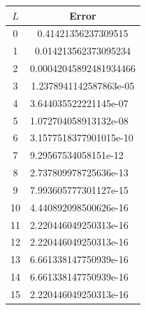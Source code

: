 \documentclass[12pt, a4paper]{article}
\begin{document}
\begin{minipage}{\textwidth}\centering
	\begin{tabular}{|l|l|}
	\hline
	\multicolumn{1}{|c|}{$L$} & \multicolumn{1}{c|}{Error}                  \\ \hline
	\multicolumn{1}{|c|}{0}   & \multicolumn{1}{c|}{0.41421356237309515}    \\ \hline
	\multicolumn{1}{|c|}{1}   & \multicolumn{1}{c|}{0.014213562373095234}   \\ \hline
	\multicolumn{1}{|c|}{2}   & \multicolumn{1}{c|}{0.00042045892481934466} \\ \hline
	\multicolumn{1}{|c|}{3}   & \multicolumn{1}{c|}{1.2378941142587863e-05} \\ \hline
	\multicolumn{1}{|c|}{4}   & 3.644035522221145e-07                       \\ \hline
	\multicolumn{1}{|c|}{5}   & 1.072704058913132e-08                       \\ \hline
	\multicolumn{1}{|c|}{6}   & 3.1577518377901015e-10                      \\ \hline
	\multicolumn{1}{|c|}{7}   & 9.29567534058151e-12                        \\ \hline
	\multicolumn{1}{|c|}{8}   & 2.737809978725636e-13                       \\ \hline
	\multicolumn{1}{|c|}{9}   & 7.993605777301127e-15                       \\ \hline
	10                        & 4.440892098500626e-16                       \\ \hline
	11                        & 2.220446049250313e-16                       \\ \hline
	12                        & 2.220446049250313e-16                       \\ \hline
	13                        & 6.661338147750939e-16                       \\ \hline
	14                        & 6.661338147750939e-16                       \\ \hline
	15                        & 2.220446049250313e-16                       \\ \hline
	\end{tabular}
\end{minipage}
\vspace{0.3cm}
\end{document}
